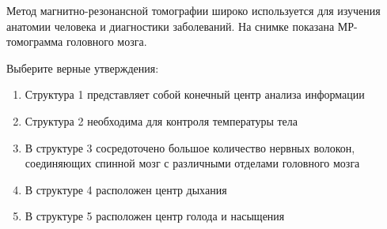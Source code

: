 
Метод
магнитно-резонансной томографии широко используется для изучения анатомии
человека и диагностики заболеваний. На снимке показана МР-томограмма головного
мозга.


Выберите
верные утверждения:

\begin{enumerate}
    \item Структура 1 представляет собой конечный центр анализа информации
    \item Структура 2 необходима для контроля температуры тела
    \item В структуре 3 сосредоточено большое количество нервных волокон, соединяющих спинной мозг с различными отделами головного мозга
    \item В структуре 4 расположен центр дыхания
    \item В структуре 5 расположен центр голода и насыщения 
\end{enumerate}
 
\explanationSection

